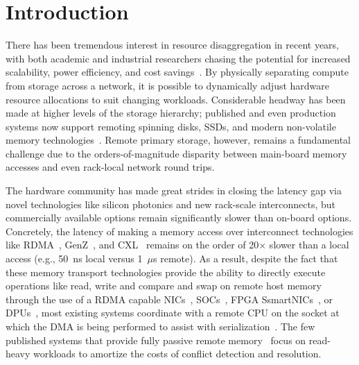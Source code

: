 \section{Introduction}

There has been tremendous interest in resource disaggregation in
recent years, with both academic and industrial researchers chasing
the potential for increased scalability, power efficiency, and cost
savings~\cite{fastswap,rethinking,the-machine,requirements,clio-arxiv,firebox,leap,zombieland,storm,aifm,legoos,supernic}.
By physically separating compute from storage across a network, it is
possible to dynamically adjust hardware resource allocations to suit
changing workloads.  Considerable headway has been made at higher
levels of the storage hierarchy; published and even production systems
now support remoting spinning disks, SSDs, and modern non-volatile
memory technologies~\cite{decible}.  Remote primary storage, however,
remains a fundamental challenge due to the orders-of-magnitude
disparity between main-board memory accesses and even rack-local
network round trips.



The hardware community has made great strides in closing the latency
gap via novel technologies like silicon photonics and new rack-scale
interconnects, but commercially available options remain significantly
slower than on-board options.  Concretely, the latency of making a
memory access over interconnect technologies
like RDMA~\cite{infiniband-spec}, GenZ~\cite{genz}, and CXL~\cite{cxl}
remains on the order of 20$\times$ slower than a local access (e.g.,
50~ns local versus 1~$\mu$s remote).  As a result, despite the fact
that these memory transport technologies provide the ability to
directly execute operations like read, write and compare and swap on
remote host memory through the use of a RDMA capable
NICs~\cite{connectx}, SOCs~\cite{cavium}, FPGA
SsmartNICs~\cite{corundum,kv-direct}, or DPUs~\cite{fungible}, most
existing systems coordinate with a remote CPU on the socket at which
the DMA is being performed to assist with
serialization~\cite{cliquemap,erpc,herd,sonuma,storm}.  The few
published systems that provide fully passive remote
memory~\cite{reigons,clover} focus on read-heavy workloads to
amortize the costs of conflict detection and resolution.

